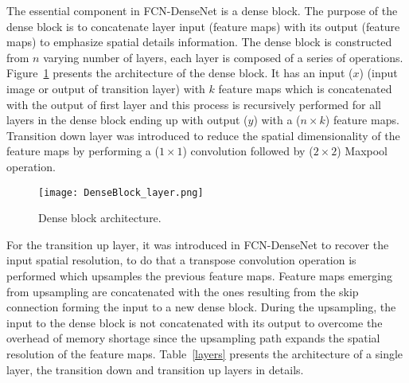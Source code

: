 	The essential component in FCN-DenseNet is a dense block.
	The purpose of the dense block is to concatenate layer input (feature maps) with its output (feature maps) to emphasize spatial details information.
	The dense block is constructed from \(n\) varying number of layers, each layer is composed of a series of operations.
	Figure~\ref{dense_block} presents the architecture of the dense block.
	It has an input (\(x\)) (input image or output of transition layer) with \(k\) feature maps which is concatenated with the output of first layer and this process is recursively performed for all layers in the dense block ending up with output (\(y\)) with a (\(n\times k\)) feature maps. 
	Transition down layer was introduced to reduce the spatial dimensionality of the feature maps by performing a (\(1\times 1\)) convolution followed by (\(2\times2\)) Maxpool operation. 

	\begin{figure} [h!]
		\begin{center}
			\texttt{[image: DenseBlock\_layer.png]}
		\end{center}
		\caption{Dense block architecture.} 
		\label{dense_block}
	\end{figure}

	For the transition up layer, it was introduced in FCN-DenseNet to recover the input spatial resolution, to do that a transpose convolution operation is performed which upsamples the previous feature maps.
	Feature maps emerging from upsampling are concatenated with the ones resulting from the skip connection forming the input to a new dense block.
	During the upsampling, the input to the dense block is not concatenated with its output to overcome the overhead of memory shortage since the upsampling path expands the spatial resolution of the feature maps.
	Table~\ref{layers} presents the architecture of a single layer, the transition down  and transition up layers in details.

